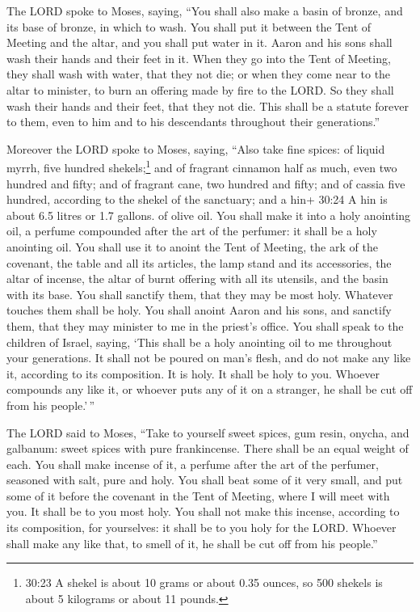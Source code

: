  The LORD spoke to Moses, saying,  ``You shall
also make a basin of bronze, and its base of bronze, in which to wash.
You shall put it between the Tent of Meeting and the altar, and you
shall put water in it.  Aaron and his sons shall wash their
hands and their feet in it.  When they go into the Tent of
Meeting, they shall wash with water, that they not die; or when they
come near to the altar to minister, to burn an offering made by fire to
the LORD.  So they shall wash their hands and their feet,
that they not die. This shall be a statute forever to them, even to him
and to his descendants throughout their generations.''

 Moreover the LORD spoke to Moses, saying, 
``Also take fine spices: of liquid myrrh, five hundred
shekels;\footnote{30:23 A shekel is about 10 grams or about 0.35 ounces,
  so 500 shekels is about 5 kilograms or about 11 pounds.} and of
fragrant cinnamon half as much, even two hundred and fifty; and of
fragrant cane, two hundred and fifty;  and of cassia five
hundred, according to the shekel of the sanctuary; and a hin+ 30:24 A
hin is about 6.5 litres or 1.7 gallons. of olive oil.  You
shall make it into a holy anointing oil, a perfume compounded after the
art of the perfumer: it shall be a holy anointing oil.  You
shall use it to anoint the Tent of Meeting, the ark of the covenant,
 the table and all its articles, the lamp stand and its
accessories, the altar of incense,  the altar of burnt
offering with all its utensils, and the basin with its base.
 You shall sanctify them, that they may be most holy.
Whatever touches them shall be holy.  You shall anoint
Aaron and his sons, and sanctify them, that they may minister to me in
the priest's office.  You shall speak to the children of
Israel, saying, `This shall be a holy anointing oil to me throughout
your generations.  It shall not be poured on man's flesh,
and do not make any like it, according to its composition. It is holy.
It shall be holy to you.  Whoever compounds any like it, or
whoever puts any of it on a stranger, he shall be cut off from his
people.'\,''

 The LORD said to Moses, ``Take to yourself sweet spices,
gum resin, onycha, and galbanum: sweet spices with pure frankincense.
There shall be an equal weight of each.  You shall make
incense of it, a perfume after the art of the perfumer, seasoned with
salt, pure and holy.  You shall beat some of it very small,
and put some of it before the covenant in the Tent of Meeting, where I
will meet with you. It shall be to you most holy.  You
shall not make this incense, according to its composition, for
yourselves: it shall be to you holy for the LORD.  Whoever
shall make any like that, to smell of it, he shall be cut off from his
people.''

